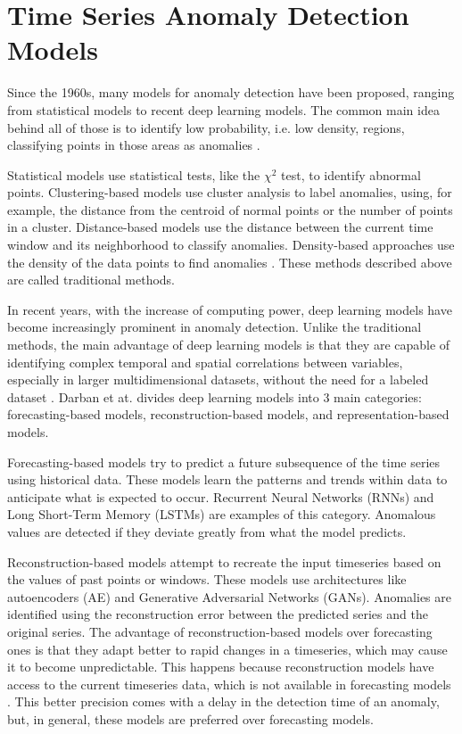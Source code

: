 \section{Time Series Anomaly Detection Models} \label{sec-model-basics}

Since the 1960s, many models for anomaly detection have been proposed, ranging from statistical models to recent deep learning models. The common main idea behind all of those is to identify low probability, i.e. low density, regions, classifying points in those areas as anomalies \cite{Samariya_Thakkar_2021}. 

Statistical models use statistical tests, like the $\chi^2$ test, to identify abnormal points. Clustering-based models use cluster analysis to label anomalies, using, for example, the distance from the centroid of normal points or the number of points in a cluster. Distance-based models use the distance between the current time window and its neighborhood to classify anomalies. Density-based approaches use the density of the data points to find anomalies \cite{Zamanzadeh_Darban_Webb_Pan_Aggarwal_Salehi_2024, Samariya_Thakkar_2021}. These methods described above are called traditional methods.

In recent years, with the increase of computing power, deep learning models have become increasingly prominent in anomaly detection. Unlike the traditional methods, the main advantage of deep learning models is that they are capable of identifying complex temporal and spatial correlations between variables, especially in larger multidimensional datasets, without the need for a labeled dataset \cite{Zamanzadeh_Darban_Webb_Pan_Aggarwal_Salehi_2024, Choi_Yi_Park_Yoon_2021}. Darban et at. \cite{Zamanzadeh_Darban_Webb_Pan_Aggarwal_Salehi_2024} divides deep learning models into 3 main categories: forecasting-based models, reconstruction-based models, and representation-based models.

Forecasting-based models try to predict a future subsequence of the time series using historical data. These models learn the patterns and trends within data to anticipate what is expected to occur. Recurrent Neural Networks (RNNs) and Long Short-Term Memory (LSTMs) are examples of this category. Anomalous values are detected if they deviate greatly from what the model predicts.

Reconstruction-based models attempt to recreate the input timeseries based on the values of past points or windows. These models use architectures like autoencoders (AE) and Generative Adversarial Networks (GANs). Anomalies are identified using the reconstruction error between the predicted series and the original series. The advantage of reconstruction-based models over forecasting ones is that they adapt better to rapid changes in a timeseries, which may cause it to become unpredictable. This happens because reconstruction models have access to the current timeseries data, which is not available in forecasting models \cite{Zamanzadeh_Darban_Webb_Pan_Aggarwal_Salehi_2024}. This better precision comes with a delay in the detection time of an anomaly, but, in general, these models are preferred over forecasting models.

